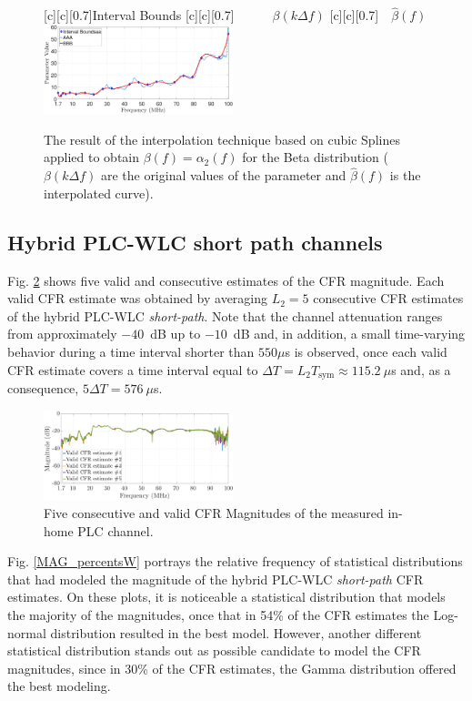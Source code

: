 \documentclass[journal]{IEEEtran}
\begin{document}
\begin{figure}[h!]
	\centering
	[c][0.7]{Interval Bounds}
	[c][0.7]{~~~~~~$\beta(k \Delta f)$}
	[c][0.7]{~~$\hat{\beta}(f)$}
	\includegraphics[width=0.49\textwidth]{images/Beta_fit_1.7.eps}
	\caption{The result of the interpolation technique based on cubic Splines applied to obtain $\beta(f) = \alpha_2(f)$ for the Beta distribution ($\beta(k \Delta f)$ are the original values of the parameter and $\hat{\beta}(f)$ is the interpolated curve).}
	\label{Fit_beta}
\end{figure}

\subsection{Hybrid PLC-WLC short path channels}\label{sec:MMHYBS}

 Fig. \ref{respfreqsW} shows five valid and consecutive estimates of the \ac{CFR} magnitude. Each valid \ac{CFR} estimate was obtained by averaging  $L_2=5$ consecutive \ac{CFR} estimates of the hybrid \ac{PLC}-\ac{WLC} \textit{short-path}. Note that the channel attenuation ranges from approximately $-40$~dB up to $-10$~dB and, in addition, a small time-varying behavior during a time interval shorter than $550\mu$s is observed, once each valid \ac{CFR} estimate covers a time interval equal to $\Delta T = L_2 T_{\textrm{sym}} \approx 115.2~\mu$s and, as a consequence, $5\Delta T = 576~\mu$s. 

\begin{figure}[h]
	\centering
	\includegraphics[width=0.49\textwidth]{images/respfreqsW.eps}
	\caption{Five consecutive and valid CFR Magnitudes of the measured in-home PLC channel.}
	\label{respfreqsW}
\end{figure}

Fig. \ref{MAG_percentsW} portrays the relative frequency of statistical distributions that had modeled the magnitude of the hybrid \ac{PLC}-\ac{WLC} \textit{short-path} \ac{CFR} estimates. On these plots, it is noticeable a statistical distribution that models the majority of the magnitudes, once that in 54\% of the \ac{CFR} estimates the Log-normal distribution resulted in the best model. However, another different statistical distribution stands out as possible candidate to model the \ac{CFR} magnitudes, since in 30\% of the \ac{CFR} estimates, the Gamma distribution offered the best modeling. 
\end{document}
